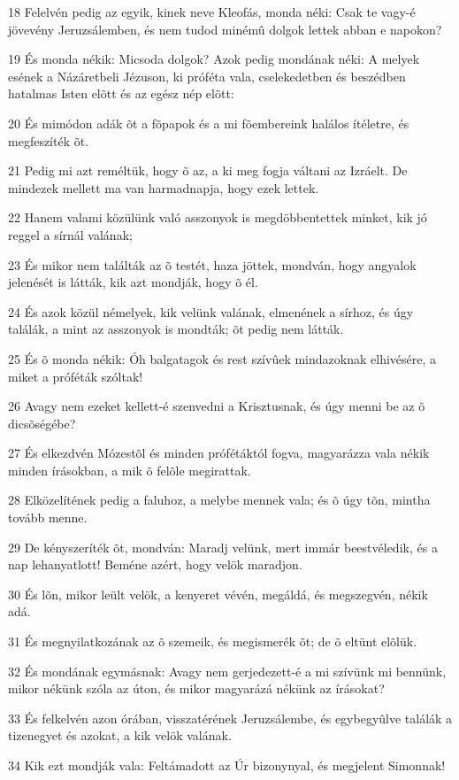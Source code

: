 \par 18 Felelvén pedig az egyik, kinek neve Kleofás, monda néki: Csak te vagy-é jövevény Jeruzsálemben, és nem tudod minémû dolgok lettek abban e napokon?
\par 19 És monda nékik: Micsoda dolgok? Azok pedig mondának néki: A melyek esének a Názáretbeli Jézuson, ki próféta vala, cselekedetben és beszédben hatalmas Isten elõtt és az egész nép elõtt:
\par 20 És mimódon adák õt a fõpapok és a mi fõembereink halálos ítéletre, és megfeszíték õt.
\par 21 Pedig mi azt reméltük, hogy õ az, a ki meg fogja váltani az Izráelt. De mindezek mellett ma van harmadnapja, hogy ezek lettek.
\par 22 Hanem valami közülünk való asszonyok is megdöbbentettek minket, kik jó reggel a sírnál valának;
\par 23 És mikor nem találták az õ testét, haza jöttek, mondván, hogy angyalok jelenését is látták, kik azt mondják, hogy õ él.
\par 24 És azok közül némelyek, kik velünk valának, elmenének a sírhoz, és úgy találák, a mint az asszonyok is mondták; õt pedig nem látták.
\par 25 És õ monda nékik: Óh balgatagok és rest szívûek mindazoknak elhivésére, a miket a próféták szóltak!
\par 26 Avagy nem ezeket kellett-é szenvedni a Krisztusnak, és úgy menni be az õ dicsõségébe?
\par 27 És elkezdvén Mózestõl és minden prófétáktól fogva, magyarázza vala nékik minden írásokban, a mik õ felõle megirattak.
\par 28 Elközelítének pedig a faluhoz, a melybe mennek vala; és õ úgy tõn, mintha tovább menne.
\par 29 De kényszeríték õt, mondván: Maradj velünk, mert immár beestvéledik, és a nap lehanyatlott! Beméne azért, hogy velök maradjon.
\par 30 És lõn, mikor leült velök, a kenyeret vévén, megáldá, és megszegvén, nékik adá.
\par 31 És megnyilatkozának az õ szemeik, és megismerék õt; de õ eltünt elõlük.
\par 32 És mondának egymásnak: Avagy nem gerjedezett-é a mi szívünk mi bennünk, mikor nékünk szóla az úton, és mikor magyarázá nékünk az írásokat?
\par 33 És felkelvén azon órában, visszatérének Jeruzsálembe, és egybegyûlve találák a tizenegyet és azokat, a kik velök valának.
\par 34 Kik ezt mondják vala: Feltámadott az Úr bizonynyal, és megjelent Simonnak!
